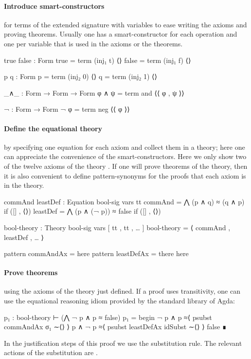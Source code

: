 \paragraph*{Introduce smart-constructors}
\label{sec:intr-smart-constr}
  for terms of the extended
  signature with variables to ease writing the axioms and proving
  theorems. Usually one has a smart-constructor for each operation and
  one per variable that is used in the axioms or the theorems.
\begin{spec}
true false : Form
true = term (inj₁ t) ⟨⟩
false = term (inj₁ f) ⟨⟩

p q  : Form
p = term (inj₂ 0) ⟨⟩
q = term (inj₂ 1) ⟨⟩

_∧_ : Form → Form → Form
φ ∧ ψ = term and ⟨⟨ φ , ψ ⟩⟩

¬ : Form → Form
¬ φ = term neg ⟨⟨ φ ⟩⟩
\end{spec}

\paragraph*{Define the equational theory}
\label{sec:define-equat-theory}

 by specifying one equation for
  each axiom and collect them in a theory; here one can appreciate the
  convenience of the smart-constructors. Here we only show two of the
  twelve axioms of the theory . If one will prove theorems
  of the theory, then it is also convenient to define pattern-synonyms
  for the proofs that each axiom is in the theory.
\begin{spec}
commAnd leastDef : Equation bool-sig vars tt
commAnd = ⋀ (p ∧ q) ≈ (q ∧ p) if ([] , ⟨⟩)
leastDef = ⋀ (p ∧ (¬ p)) ≈ false  if ([] , ⟨⟩)

bool-theory : Theory bool-sig vars [ tt , tt , … ]
bool-theory = ⟨ commAnd , leastDef , … ⟩

pattern commAndAx = here
pattern leastDefAx = there here
\end{spec}

\paragraph*{Prove theorems}
  using the axioms of the theory just defined.
  If a proof uses transitivity, one can use the equational reasoning
  idiom provided by the standard library of Agda:
\begin{spec}
  p₁ : bool-theory ⊢ (⋀ ¬ p ∧ p ≈ false)
  p₁ = begin
         ¬ p ∧ p
         ≈⟨ psubst commAndAx σ₁ ∼⟨⟩ ⟩
         p ∧ ¬ p
         ≈⟨ psubst leastDefAx idSubst ∼⟨⟩ ⟩
         false
       ∎
\end{spec}
\noindent In the justification steps of this proof we use the
substitution rule. The relevant actions of the substitution  are
.


